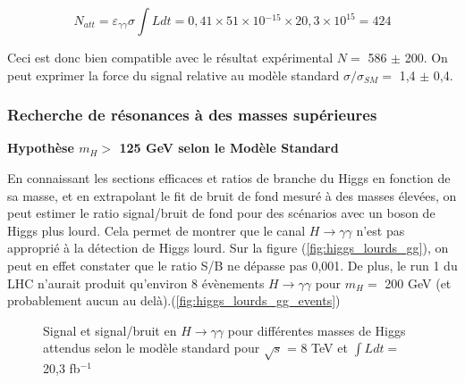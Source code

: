 \documentclass[11pt]{article} %
\begin{document}
\begin{equation}
N_{att} = \varepsilon_{\gamma\gamma} \sigma \int L dt = 0,41 \times 51 \times  \mbox{10} {}^{-15} \times 20,3 \times 10^{15} = 424
\end{equation}

Ceci est donc bien compatible avec le résultat expérimental $N =$ 586 $\pm$ 200. On peut exprimer la force du signal relative au modèle standard $\sigma / \sigma_{SM} = $ 1,4 $\pm$ 0,4. 



\subsubsection{Recherche de résonances à des masses supérieures }

\textbf{Hypothèse $m_H >$ 125 GeV selon le Modèle Standard}

En connaissant les sections efficaces et ratios de branche du Higgs en fonction de sa masse, et en extrapolant le fit de bruit de fond mesuré à des masses élevées, on peut estimer le ratio signal/bruit de fond pour des scénarios avec un boson de Higgs plus lourd. Cela permet de montrer que le canal $H \to \gamma \gamma$ n'est pas approprié à la détection de Higgs lourd. Sur la figure  (\ref{fig:higgs_lourds_gg}), on peut en effet constater que le ratio S/B ne dépasse pas 0,001. De plus, le run 1 du LHC n'aurait produit qu'environ 8 évènements $H \to \gamma \gamma$ pour $m_H =$ 200 GeV (et probablement aucun au delà).(\ref{fig:higgs_lourds_gg_events})
\begin{figure}[H]
\begin{subfigure}[b]{.5\linewidth}
\centering
 \resizebox{1.1\linewidth}{!}{}
\end{subfigure}%
\begin{subfigure}[b]{.5\linewidth}
\centering
 \resizebox{1.1\linewidth}{!}{}
\end{subfigure}
\caption{Signal et signal/bruit en $H\to\gamma\gamma$ pour différentes masses de Higgs attendus selon le modèle standard pour $\sqrt{s}$ = 8 TeV et $\int Ldt =$ 20,3 fb${}^{-1}$ }
\end{figure}
\end{document}
